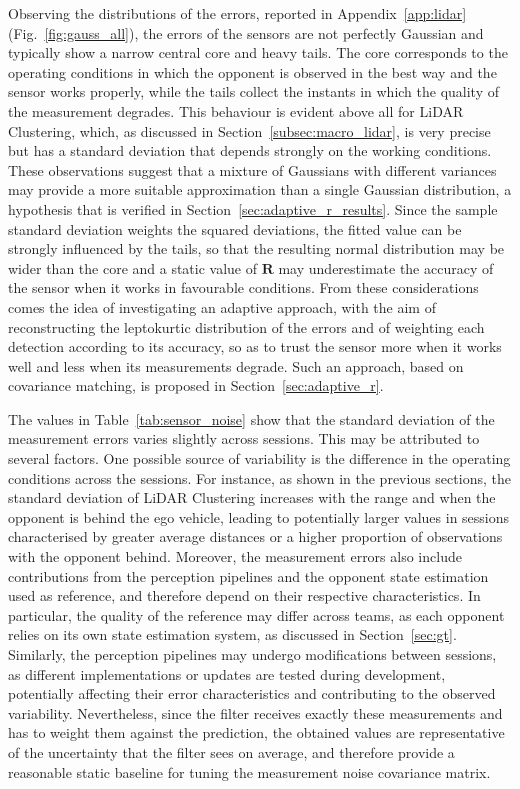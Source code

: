 Observing the distributions of the errors, reported in Appendix~\ref{app:lidar}
(Fig.~\ref{fig:gauss_all}), the errors of the sensors are not perfectly Gaussian and
typically show a narrow central core and heavy tails. The core corresponds to the operating
conditions in which the opponent is observed in the best way and the sensor works properly,
while the tails collect the instants in which the quality of the measurement degrades. This
behaviour is evident above all for LiDAR Clustering, which, as discussed in
Section~\ref{subsec:macro_lidar}, is very precise but has a standard deviation that
depends strongly on the working conditions. These observations suggest that a mixture of
Gaussians with different variances may provide a more suitable approximation than a single
Gaussian distribution, a hypothesis that is verified in Section~\ref{sec:adaptive_r_results}.
Since the sample standard deviation weights the squared deviations, the fitted value can be
strongly influenced by the tails, so that the resulting normal distribution may be wider than
the core and a static value of $\mathbf{R}$ may underestimate the accuracy of the sensor when
it works in favourable conditions. From these considerations comes the idea of investigating an adaptive approach,
with the aim of reconstructing the leptokurtic distribution of the errors and of weighting
each detection according to its accuracy, so as to trust the sensor more when it works well
and less when its measurements degrade. Such an approach, based on covariance matching, is
proposed in Section~\ref{sec:adaptive_r}.

The values in Table~\ref{tab:sensor_noise} show that the standard deviation of the measurement errors varies slightly across sessions. This may be attributed to several factors. One possible source of variability is the difference in the operating conditions across the sessions. For instance, as shown in the previous sections, the standard deviation of LiDAR Clustering increases with the range and when the opponent is behind the ego vehicle, leading to potentially larger values in sessions characterised by greater average distances or a higher proportion of observations with the opponent behind. Moreover, the measurement errors also include contributions from the perception pipelines and the opponent state estimation used as reference, and therefore depend on their respective characteristics. In particular, the quality of the reference may differ across teams, as each opponent relies on its own state estimation system, as discussed in Section~\ref{sec:gt}. Similarly, the perception pipelines may undergo modifications between sessions, as different implementations or updates are tested during development, potentially affecting their error characteristics and contributing to the observed variability. Nevertheless, since the filter receives exactly these measurements and has to weight them
against the prediction, the obtained values are representative of the uncertainty that the
filter sees on average, and therefore provide a reasonable static baseline for tuning the
measurement noise covariance matrix.

